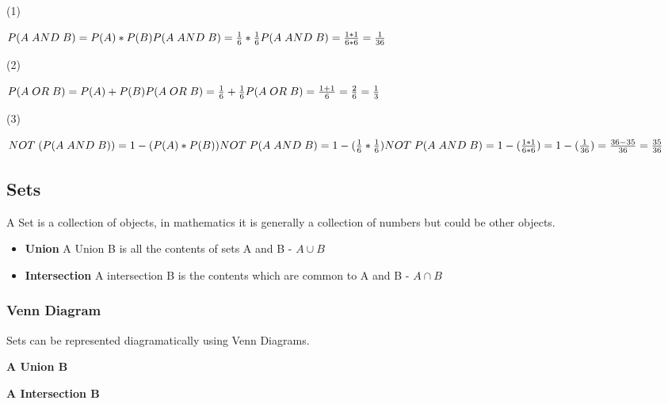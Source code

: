 \documentclass{article}
\begin{document}
(1)

$\\P(A\;AND\;B) = P(A) * P(B) \\
P(A\;AND\;B) = \frac{1}{6} * \frac{1}{6} \\
P(A\;AND\;B) = \frac{1 * 1}{6 * 6} = \frac{1}{36}
$

(2)

$\\P(A\;OR\;B) = P(A) + P(B) \\
P(A\;OR\;B) = \frac{1}{6} + \frac{1}{6} \\
P(A\;OR\;B) = \frac{1 + 1}{6} = \frac{2}{6} = \frac{1}{3}
$

(3)

$\\NOT\;(P(A\;AND\;B)) = 1 - (P(A) * P(B)) \\
NOT \;P(A\;AND\;B) = 1 - (\frac{1}{6} * \frac{1}{6}) \\
NOT \; P(A\;AND\;B) = 1 -(\frac{1 * 1}{6 * 6}) = 1 - (\frac{1}{36}) = \frac{36-35}{36} = \frac{35}{36}
$

\newpage
\subsection{Sets}
A Set is a collection of objects, in mathematics it is generally a collection of numbers but could be other objects.
\begin{itemize}
\item \textbf{Union} A Union B is all the contents of sets A and B - $A \cup B$
\item \textbf{Intersection} A intersection B is the contents which are common to A and B - $A \cap B$ 
\end{itemize}
\subsubsection{Venn Diagram}
Sets can be represented diagramatically using Venn Diagrams.

\textbf{A Union B}
\begin{center}
\end{center}

\textbf{A Intersection B}
\begin{center}
\end{center}
\end{document}
